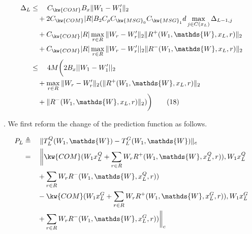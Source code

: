 
\begin{align*}
	\Delta_{L} & \leq\quad C_{\kw{COM}} B_x\|W_1-W_1^{\prime}\|_2 \\
	&\quad + 2C_{\kw{COM}} |R| B_2C_\rho C_{\kw{MSG}_0}C_{\kw{MSG}_1}d\max_{j\in C(x_L)}\Delta_{L-1,j} \\
	&\quad + C_{\kw{COM}}|R|\max_{r\in R}\|W_r-W_r^{\prime}\|_2\|R^+(W_1,\mathds{W},x_L,r)\|_2\\
	&\quad + C_{\kw{COM}}|R|\max_{r\in R}\|W_r-W_r^{\prime}||_2\|R^-(W_1,\mathds{W},x_L,r)\|_2\\
	&\leq\quad 4M \bigg(2B_{x}||W_{1}-W_{1}^{\prime}||_{2}\\
	&\quad+\max_{r\in R}\|W_r-
	W_r^{\prime}\|_2(\|R^+(W_1,\mathds{W},x_L,r)\|_2\\
	&\quad+\|R^-(W_1,\mathds{W},x_L,r)\|_2)\bigg) \tag{18}
\end{align*}




.
We first reform the change of 
the prediction function as follows. 

\begin{equation*}\begin{aligned}
		P_{L} & \triangleq\quad\|T^Q_{L}(W_{1},\mathds{W})-T^G_{L}(W_{1},
		\mathds{W})\|_c \\
		& =\quad\bigg\|\kw{COM}(W_{1}x^Q_{L}+\sum_{r\in R} W_rR^+(W_{1},\mathds{W},x^Q_{L},r)), W_{1}x^Q_{L}\\
		& \quad\quad+\sum_{r\in R} W_rR^-(W_{1},\mathds{W},x^Q_{L},r))\\
			& \quad\quad-\kw{COM}(W_{1}x^G_{L}+\sum_{r\in R} W_rR^+(W_{1},\mathds{W},x^G_{L},r)), W_{1}x^G_{L}\\
			&\quad\quad+\sum_{r\in R} W_rR^-(W_{1},\mathds{W},x^G_{L},r)) \bigg\|_c\\
\end{aligned}\end{equation*}

